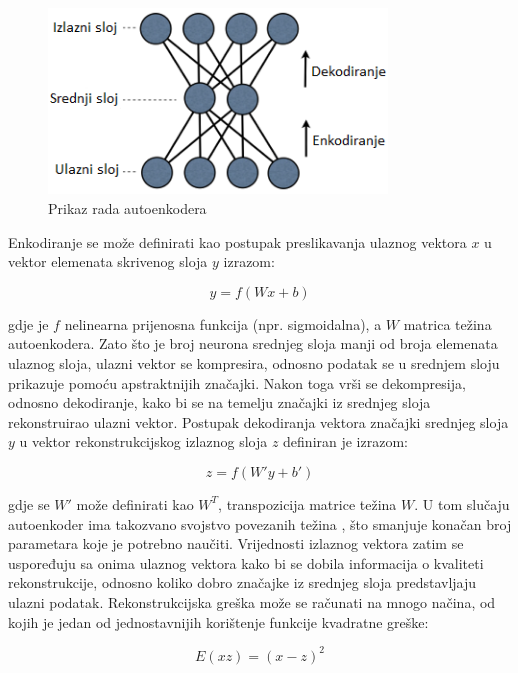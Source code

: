 \documentclass[lmodern, utf8, diplomski, numeric]{fer}
\begin{document}
\begin{figure}[ht!]
\centering
\includegraphics[width=9cm]{slike/autoencoder.png}
\caption{Prikaz rada autoenkodera}
\end{figure}

Enkodiranje se može definirati kao postupak preslikavanja ulaznog vektora $x$ u vektor elemenata skrivenog sloja $y$ izrazom:

\begin{equation}
y = f \left (Wx + b \right)          
\end{equation}


gdje je $f$ nelinearna prijenosna funkcija (npr. sigmoidalna), a $W$ matrica težina autoenkodera. Zato što je broj neurona srednjeg sloja manji od broja elemenata ulaznog sloja, ulazni vektor se kompresira, odnosno podatak se u srednjem sloju prikazuje pomoću apstraktnijih značajki. Nakon toga vrši se dekompresija, odnosno dekodiranje, kako bi se na temelju značajki iz srednjeg sloja rekonstruirao ulazni vektor. Postupak dekodiranja vektora značajki srednjeg sloja $y$ u vektor rekonstrukcijskog izlaznog sloja $z$ definiran je izrazom: 

\begin{equation}
z = f \left (W'y + b' \right)          
\end{equation}

gdje se $W'$ može definirati kao $W^{T}$, transpozicija matrice težina $W$. U tom slučaju autoenkoder ima takozvano svojstvo povezanih težina , što smanjuje konačan broj parametara koje je potrebno naučiti. Vrijednosti izlaznog vektora zatim se uspoređuju sa onima ulaznog vektora kako bi se dobila informacija o kvaliteti rekonstrukcije, odnosno koliko dobro značajke iz srednjeg sloja predstavljaju ulazni podatak. Rekonstrukcijska greška može se računati na mnogo načina, od kojih je jedan od jednostavnijih korištenje funkcije kvadratne greške:

\begin{equation}
E(xz) = (x-z)^2          
\end{equation}
\end{document}
